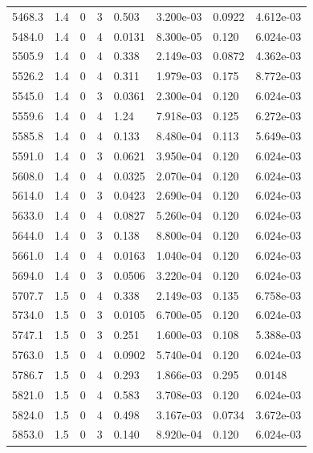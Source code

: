 \documentclass[preview]{standalone}
\begin{document}
{{{{{{{{{\begin{tabular}{L{1.2cm}C{1.2cm} C{0.3cm}C{0.5cm} C{1.4cm}C{1.4cm} C{1.4cm}C{1.4cm}}
  5468.3  &   1.4  & 0     &  3 &  0.503  & 3.200e-03  & 0.0922 &  4.612e-03   \\ 
  5484.0  &   1.4  & 0     &  4 &  0.0131  & 8.300e-05  & 0.120 &  6.024e-03   \\ 
  5505.9  &   1.4  & 0     &  4 &  0.338  & 2.149e-03  & 0.0872 &  4.362e-03   \\ 
  5526.2  &   1.4  & 0     &  4 &  0.311  & 1.979e-03  & 0.175 &  8.772e-03   \\ 
  5545.0  &   1.4  & 0     &  3 &  0.0361  & 2.300e-04  & 0.120 &  6.024e-03   \\ 
  5559.6  &   1.4  & 0     &  4 &  1.24  & 7.918e-03  & 0.125 &  6.272e-03   \\ 
  5585.8  &   1.4  & 0     &  4 &  0.133  & 8.480e-04  & 0.113 &  5.649e-03   \\ 
  5591.0  &   1.4  & 0     &  3 &  0.0621  & 3.950e-04  & 0.120 &  6.024e-03   \\ 
  5608.0  &   1.4  & 0     &  4 &  0.0325  & 2.070e-04  & 0.120 &  6.024e-03   \\ 
  5614.0  &   1.4  & 0     &  3 &  0.0423  & 2.690e-04  & 0.120 &  6.024e-03   \\ 
  5633.0  &   1.4  & 0     &  4 &  0.0827  & 5.260e-04  & 0.120 &  6.024e-03   \\ 
  5644.0  &   1.4  & 0     &  3 &  0.138  & 8.800e-04  & 0.120 &  6.024e-03   \\ 
  5661.0  &   1.4  & 0     &  4 &  0.0163  & 1.040e-04  & 0.120 &  6.024e-03   \\ 
  5694.0  &   1.4  & 0     &  3 &  0.0506  & 3.220e-04  & 0.120 &  6.024e-03   \\ 
  5707.7  &   1.5  & 0     &  4 &  0.338  & 2.149e-03  & 0.135 &  6.758e-03   \\ 
  5734.0  &   1.5  & 0     &  3 &  0.0105  & 6.700e-05  & 0.120 &  6.024e-03   \\ 
  5747.1  &   1.5  & 0     &  3 &  0.251  & 1.600e-03  & 0.108 &  5.388e-03   \\ 
  5763.0  &   1.5  & 0     &  4 &  0.0902  & 5.740e-04  & 0.120 &  6.024e-03   \\ 
  5786.7  &   1.5  & 0     &  4 &  0.293  & 1.866e-03  & 0.295 &  0.0148   \\ 
  5821.0  &   1.5  & 0     &  4 &  0.583  & 3.708e-03  & 0.120 &  6.024e-03   \\ 
  5824.0  &   1.5  & 0     &  4 &  0.498  & 3.167e-03  & 0.0734 &  3.672e-03   \\ 
  5853.0  &   1.5  & 0     &  3 &  0.140  & 8.920e-04  & 0.120 &  6.024e-03   \\ 

\end{tabular}}}}}}}}}}
\end{document}
